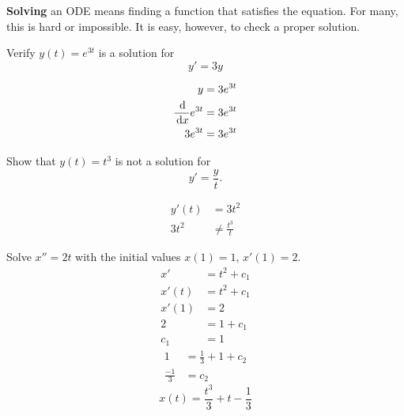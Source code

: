 \textbf{Solving} an ODE means finding a function that satisfies the equation.
For many, this is hard or impossible.
It is easy, however, to check a proper solution.
\begin{ex}
  Verify $y(t)=e^{3t}$ is a solution for
  \[ y'=3y \]
  \begin{sol}
    \begin{align*}
      y&=3e^{3t} \\
      \frac{\,\mathrm{d}}{\,\mathrm{d} x} e^{3t} &=3e^{3t} \\
      3e^{3t} &= 3e^{3t}
    \end{align*}
  \end{sol}
\end{ex}
\begin{ex}
  Show that $y(t)=t^3$ is not a solution for \[y'=\frac{y}{t}.\]
  \begin{sol}
    \begin{align*}
      y'(t)&=3t^2 \\
      3t^2 &\neq \frac{t^3}{t}
    \end{align*}
  \end{sol}
\end{ex}
\begin{ex}
  Solve $x''=2t$ with the initial values $x(1)=1$, $x'(1)=2$.
  \begin{align*}
    x'&= t^2 +c_1 \\
    x'(t) &= t^2 + c_1 \\
    x'(1) &=2 \\
    2&= 1+c_1 \\
    c_1 &=1
  \end{align*}
  \begin{align*}
    1&=\frac{1}{3}+1+c_2 \\
    \frac{-1}{3} &= c_2
  \end{align*}
  \[ x(t) = \frac{t^3}{3}+t-\frac{1}{3} \]
\end{ex}

